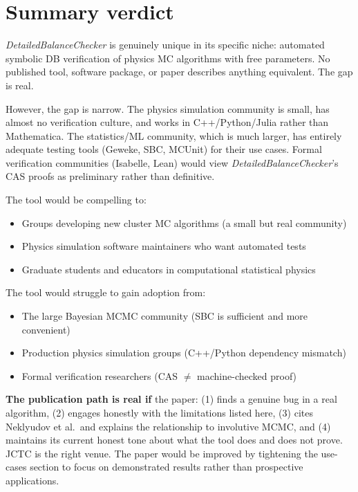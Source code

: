 \documentclass[11pt,a4paper]{article}
\newcommand{\DBC}{\textit{DetailedBalanceChecker}}
\begin{document}
\section{Summary verdict}
\label{sec:verdict}

\DBC{} is genuinely unique in its specific niche: automated symbolic DB verification
of physics MC algorithms with free parameters.  No published tool, software package,
or paper describes anything equivalent.  The gap is real.

However, the gap is narrow.  The physics simulation community is small, has almost
no verification culture, and works in C++/Python/Julia rather than Mathematica.
The statistics/ML community, which is much larger, has entirely adequate testing
tools (Geweke, SBC, MCUnit) for their use cases.  Formal verification communities
(Isabelle, Lean) would view \DBC{}'s CAS proofs as preliminary rather than definitive.

The tool would be compelling to:
\begin{itemize}[nosep]
  \item Groups developing new cluster MC algorithms (a small but real community)
  \item Physics simulation software maintainers who want automated tests
  \item Graduate students and educators in computational statistical physics
\end{itemize}

The tool would struggle to gain adoption from:
\begin{itemize}[nosep]
  \item The large Bayesian MCMC community (SBC is sufficient and more convenient)
  \item Production physics simulation groups (C++/Python dependency mismatch)
  \item Formal verification researchers (CAS $\neq$ machine-checked proof)
\end{itemize}

\textbf{The publication path is real if} the paper: (1) finds a genuine bug in a
real algorithm, (2) engages honestly with the limitations listed here, (3) cites
Neklyudov et al.\ and explains the relationship to involutive MCMC, and (4)
maintains its current honest tone about what the tool does and does not prove.
JCTC is the right venue.  The paper would be improved by tightening the use-cases
section to focus on demonstrated results rather than prospective applications.
\end{document}

